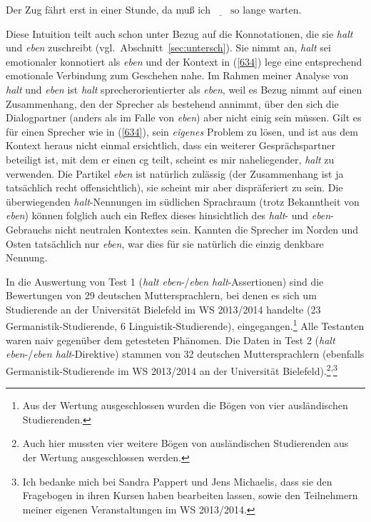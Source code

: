\begin{exe}
	\ex\label{634} 
	Der Zug fährt erst in einer Stunde, da muß ic$\textrm{h}\underline{\qquad}\textrm{s}$o lange warten.
\end{exe}
Diese Intuition teilt auch schon \citet[174]{Hentschel1986} unter Bezug auf die Konnotationen, die sie \textit{halt} und \textit{eben} zuschreibt (vgl.\ Abschnitt~\ref{sec:untersch}). Sie nimmt an, \textit{halt} sei emotionaler konnotiert als \textit{eben} und der Kontext in (\ref{634}) lege eine entsprechend emotionale Verbindung zum Geschehen nahe. Im Rahmen meiner Analyse von \textit{halt} und \textit{eben} ist \textit{halt} sprecherorientierter als \textit{eben}, weil es Bezug nimmt auf einen Zusammenhang, den der Sprecher als bestehend annimmt, über den sich die Dialogpartner (anders als im Falle von \textit{eben}) aber nicht einig sein müssen. Gilt es für einen Sprecher wie in (\ref{634}), sein \emph{eigenes} Problem zu lösen, und ist aus dem Kontext heraus nicht einmal ersichtlich, dass ein weiterer Gesprächspartner beteiligt ist, mit dem er einen cg teilt, scheint es mir naheliegender, \textit{halt} zu verwenden. Die Partikel \textit{eben} ist natürlich zulässig (der Zusammenhang ist ja tatsächlich recht offensichtlich), sie scheint mir aber dispräferiert zu sein. Die überwiegenden \textit{halt}-Nennungen im südlichen Sprachraum (trotz Bekanntheit von \textit{eben}) können folglich auch ein Reflex dieses hinsichtlich des \textit{halt}- und \textit{eben}-Gebrauchs nicht neutralen Kontextes sein. Kannten die Sprecher im Norden und Osten tatsächlich nur \textit{eben}, war dies für sie natürlich die einzig denkbare Nennung.

In die Auswertung von Test 1 (\textit{halt eben}-/\textit{eben halt}-Assertionen)  sind die Bewertungen von 29 deutschen Muttersprachlern, bei denen es sich um Studierende an der Universität Bielefeld im WS 2013/2014 handelte (23 Germanistik-Studieren\-de, 6 Linguistik-Studierende), eingegangen.\footnote{Aus der Wertung ausgeschlossen wurden die Bögen von vier ausländischen Studierenden.} Alle Testanten waren naiv gegenüber dem getesteten Phänomen. Die Daten in Test 2 (\textit{halt eben}-/\textit{eben halt}-Direktive) stammen von 32 deutschen Muttersprachlern (ebenfalls Germanistik-Studierende im WS 2013/2014 an der Universität Bielefeld).\footnote{Auch hier mussten vier weitere Bögen von ausländischen Studierenden aus der Wertung ausgeschlossen werden.}\textsuperscript{,}\footnote{Ich bedanke mich bei Sandra Pappert und Jens Michaelis, dass sie den Fragebogen in ihren Kursen haben bearbeiten lassen, sowie den Teilnehmern meiner eigenen Veranstaltungen im WS 2013/2014.} 

